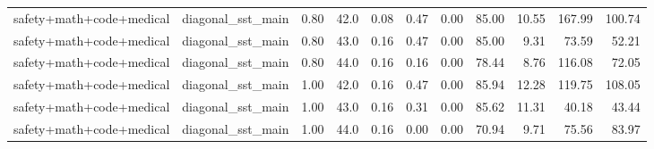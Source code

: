 \begin{table}[H]
{\begin{tabular}{llllrrrrrrr}
safety+math+code+medical & diagonal\_sst\_main & 0.80 & 42.0 & 0.08 & 0.47 & 0.00 & 85.00 & 10.55 & 167.99 & 100.74 \\
safety+math+code+medical & diagonal\_sst\_main & 0.80 & 43.0 & 0.16 & 0.47 & 0.00 & 85.00 & 9.31 & 73.59 & 52.21 \\
safety+math+code+medical & diagonal\_sst\_main & 0.80 & 44.0 & 0.16 & 0.16 & 0.00 & 78.44 & 8.76 & 116.08 & 72.05 \\
safety+math+code+medical & diagonal\_sst\_main & 1.00 & 42.0 & 0.16 & 0.47 & 0.00 & 85.94 & 12.28 & 119.75 & 108.05 \\
safety+math+code+medical & diagonal\_sst\_main & 1.00 & 43.0 & 0.16 & 0.31 & 0.00 & 85.62 & 11.31 & 40.18 & 43.44 \\
safety+math+code+medical & diagonal\_sst\_main & 1.00 & 44.0 & 0.16 & 0.00 & 0.00 & 70.94 & 9.71 & 75.56 & 83.97 \\
\bottomrule
\end{tabular}
}
\end{table}